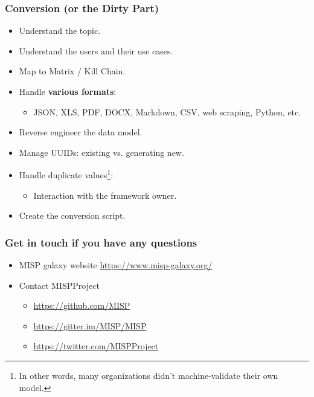 \begin{frame}
        \frametitle{Conversion (or the Dirty Part)}
        \begin{itemize}
            \item Understand the topic.
            \item Understand the users and their use cases.
            \item Map to Matrix / Kill Chain.
            \item Handle \textbf{various formats}:
                \begin{itemize}
                    \item JSON, XLS, PDF, DOCX, Markdown, CSV, web scraping, Python, etc.
                \end{itemize}
            \item Reverse engineer the data model.
            \item Manage UUIDs: existing vs. generating new.
            \item Handle duplicate values\footnote{In other words, many organizations didn’t machine-validate their own model.}:
                \begin{itemize}
                    \item Interaction with the framework owner.
                \end{itemize}
            \item Create the conversion script.
        \end{itemize}
\end{frame}


\begin{frame}
  \frametitle{Get in touch if you have any questions}
  \begin{itemize}
    \item MISP galaxy website \url{https://www.misp-galaxy.org/}
    \item Contact MISPProject 
    \begin{itemize}
      \item \url{https://github.com/MISP}
      \item \url{https://gitter.im/MISP/MISP}
      \item \url{https://twitter.com/MISPProject}
    \end{itemize}
  \end{itemize}
\end{frame}

